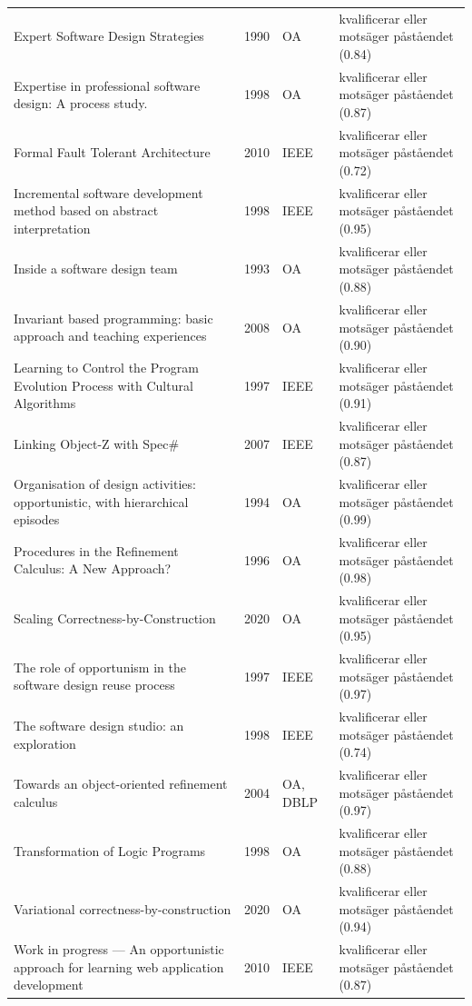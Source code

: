 \begin{longtable}{@{}%
  >{\raggedright\arraybackslash}p{}c%
  >{\raggedright\arraybackslash}p{}%
  >{\raggedright\arraybackslash}p{}@{}}
Expert Software Design Strategies & 1990 & OA & kvalificerar eller motsäger påståendet (0.84) \\
Expertise in professional software design: A process study. & 1998 & OA & kvalificerar eller motsäger påståendet (0.87) \\
Formal Fault Tolerant Architecture & 2010 & IEEE & kvalificerar eller motsäger påståendet (0.72) \\
Incremental software development method based on abstract interpretation & 1998 & IEEE & kvalificerar eller motsäger påståendet (0.95) \\
Inside a software design team & 1993 & OA & kvalificerar eller motsäger påståendet (0.88) \\
Invariant based programming: basic approach and teaching experiences & 2008 & OA & kvalificerar eller motsäger påståendet (0.90) \\
Learning to Control the Program Evolution Process with Cultural Algorithms & 1997 & IEEE & kvalificerar eller motsäger påståendet (0.91) \\
Linking Object-Z with Spec\# & 2007 & IEEE & kvalificerar eller motsäger påståendet (0.87) \\
Organisation of design activities: opportunistic, with hierarchical episodes & 1994 & OA & kvalificerar eller motsäger påståendet (0.99) \\
Procedures in the Refinement Calculus: A New Approach? & 1996 & OA & kvalificerar eller motsäger påståendet (0.98) \\
Scaling Correctness-by-Construction & 2020 & OA & kvalificerar eller motsäger påståendet (0.95) \\
The role of opportunism in the software design reuse process & 1997 & IEEE & kvalificerar eller motsäger påståendet (0.97) \\
The software design studio: an exploration & 1998 & IEEE & kvalificerar eller motsäger påståendet (0.74) \\
Towards an object-oriented refinement calculus & 2004 & OA, DBLP & kvalificerar eller motsäger påståendet (0.97) \\
Transformation of Logic Programs & 1998 & OA & kvalificerar eller motsäger påståendet (0.88) \\
Variational correctness-by-construction & 2020 & OA & kvalificerar eller motsäger påståendet (0.94) \\
Work in progress --- An opportunistic approach for learning web application development & 2010 & IEEE & kvalificerar eller motsäger påståendet (0.87) \\
\end{longtable}
\endgroup
